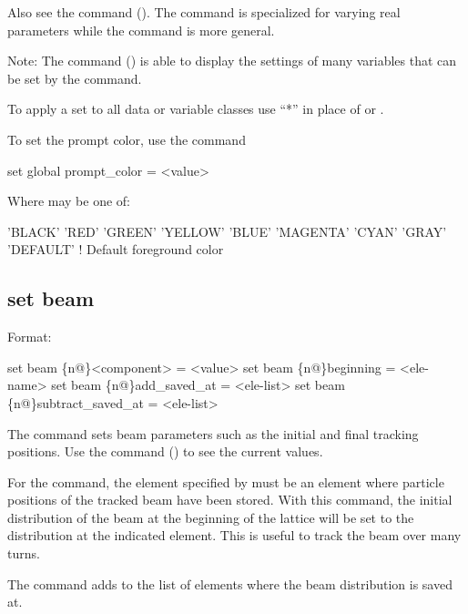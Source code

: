 {{Also see the  command (). The  command is specialized
for varying real parameters while the  command is more general.

Note: The  command () is able to display the settings of many variables
that can be set by the  command.

To apply a set to all data or variable classes use ``*'' in place of  or
.

To set the prompt color, use the command
\begin{example}
  set global prompt_color = <value>
\end{example}
Where  may be one of:
\begin{example}
  'BLACK'
  'RED'
  'GREEN'
  'YELLOW'
  'BLUE'
  'MAGENTA'
  'CYAN'
  'GRAY'
  'DEFAULT'       ! Default foreground color
\end{example}



\subsection{set beam}
\label{s:set.beam}

Format:
\begin{example}
  set beam \{n@\}<component> = <value>
  set beam \{n@\}beginning = <ele-name>
  set beam \{n@\}add_saved_at = <ele-list>
  set beam \{n@\}subtract_saved_at = <ele-list>
\end{example}

The  command sets beam parameters such as the initial and final tracking positions.
Use the  command () to see the current values.

For the  command, the element specified by  must be
an element where particle positions of the tracked beam have been stored. With this command, the initial
distribution of the beam at the beginning of the lattice will be set to the distribution at the indicated
element. This is useful to track the beam over many turns.

The  command adds to the list of elements where the beam distribution is 
saved at. 

}}
